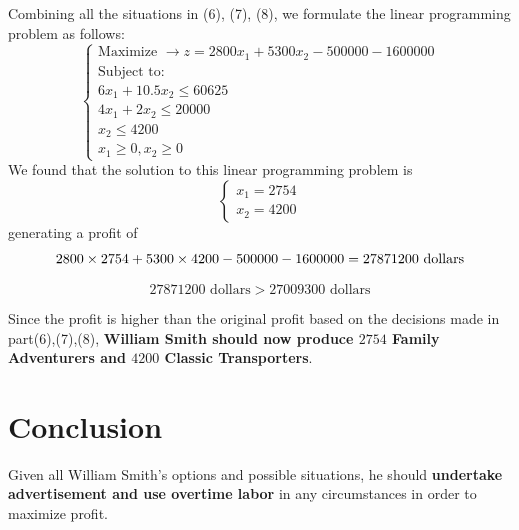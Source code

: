 \documentclass[
]{article}
\begin{document}
\begin{enumerate}
  Combining all the situations in (6), (7), (8), we formulate the linear
  programming problem as follows: \[
    \begin{cases}
      \text{Maximize  } \rightarrow z = 2800x_1 + 5300x_2 -500000 - 1600000\\
      \text{Subject to:}\\
      6x_1 +10.5x_2 \leq 60625\\
      4x_1 + 2x_2 \leq 20000\\
      x_2 \leq 4200\\
      x_1 \geq 0, x_2 \geq 0
    \end{cases}
  \] We found that the solution to this linear programming problem is \[
    \begin{cases}
      x_1 = 2754\\ 
      x_2 = 4200
    \end{cases}
  \] generating a profit of \[
      2800 \times 2754 + 5300 \times 4200 - 500000 - 1600000= 27871200 \text{   dollars}\\
  \]

  \[
      27871200\text{   dollars} > 27009300\text{   dollars}
  \]

  Since the profit is higher than the original profit based on the
  decisions made in part(6),(7),(8), \textbf{William Smith should now
  produce \(2754\) Family Adventurers and \(4200\) Classic
  Transporters}.
\end{enumerate}

\hypertarget{conclusion}{%
\section{Conclusion}\label{conclusion}}

Given all William Smith's options and possible situations, he should
\textbf{undertake advertisement and use overtime labor} in any
circumstances in order to maximize profit.
\end{document}

